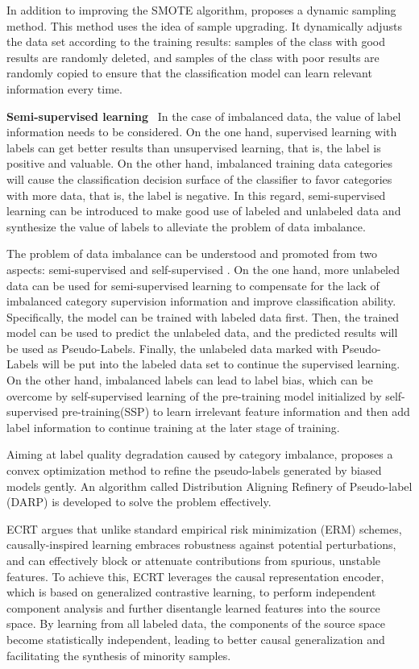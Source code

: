 In addition to improving the SMOTE algorithm, \cite{pouyanfar2018dynamic} proposes a dynamic sampling method. This method uses the idea of sample upgrading. It dynamically adjusts the data set according to the training results:  samples of the class with good results are randomly deleted, and samples of the class with poor results are randomly copied to ensure that the classification model can learn relevant information every time.

\textbf{Semi-supervised learning} \
In the case of imbalanced data, the value of label information needs to be considered. On the one hand, supervised learning with labels can get better results than unsupervised learning, that is, the label is positive and valuable.
On the other hand, imbalanced training data categories will cause the classification decision surface of the classifier to favor categories with more data, that is, the label is negative.
In this regard, semi-supervised learning can be introduced to make good use of labeled and unlabeled data and synthesize the value of labels to alleviate the problem of data imbalance.

The problem of data imbalance can be understood and promoted from two aspects: semi-supervised and self-supervised \cite{yang2020rethinking}. On the one hand, more unlabeled data can be used for semi-supervised learning to compensate for the lack of imbalanced category supervision information and improve classification ability. Specifically, the model can be trained with labeled data first. Then, the trained model can be used to predict the unlabeled data, and the predicted results will be used as Pseudo-Labels. Finally, the unlabeled data marked with Pseudo-Labels will be put into the labeled data set to continue the supervised learning. On the other hand, imbalanced labels can lead to label bias, which can be overcome by self-supervised learning of the pre-training model initialized by self-supervised pre-training(SSP) to learn irrelevant feature information and then add label information to continue training at the later stage of training.

Aiming at label quality degradation caused by category imbalance, \cite{kim2020distribution} proposes a convex optimization method to refine the pseudo-labels generated by biased models gently. An algorithm called Distribution Aligning Refinery of Pseudo-label (DARP) is developed to solve the problem effectively.

ECRT \cite{chen2021supercharging} argues that unlike standard empirical risk minimization (ERM) schemes, causally-inspired learning embraces robustness against potential perturbations, and can effectively block or attenuate contributions from spurious, unstable features. To achieve this, ECRT leverages the causal representation encoder, which is based on generalized contrastive learning, to perform independent component analysis and further disentangle learned features into the source space. By learning from all labeled data, the components of the source space become statistically independent, leading to better causal generalization and facilitating the synthesis of minority samples.




